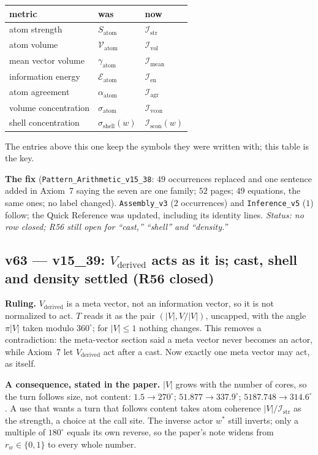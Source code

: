 \documentclass[11pt]{article}
\begin{document}
\begin{center}
\begin{tabular}{lll}
metric & was & now \\ \hline
atom strength & $S_{\text{atom}}$ & $\mathcal I_{\mathrm{str}}$ \\
atom volume & $\mathcal V_{\text{atom}}$ & $\mathcal I_{\mathrm{vol}}$ \\
mean vector volume & $\gamma_{\text{atom}}$ & $\mathcal I_{\mathrm{mean}}$ \\
information energy & $\mathcal E_{\text{atom}}$ & $\mathcal I_{\mathrm{en}}$ \\
atom agreement & $\alpha_{\text{atom}}$ & $\mathcal I_{\mathrm{agr}}$ \\
volume concentration & $\sigma_{\text{atom}}$ & $\mathcal I_{\mathrm{vcon}}$ \\
shell concentration & $\sigma_{\text{shell}}(w)$ & $\mathcal I_{\mathrm{scon}}(w)$ \\
\end{tabular}
\end{center}
The entries above this one keep the symbols they were written with; this table is the key.

\textbf{The fix} (\texttt{Pattern\_Arithmetic\_v15\_38}: $49$ occurrences replaced and one sentence added in Axiom~7 saying the seven are one family; $52$ pages; $49$ equations, the same ones; no label changed). \texttt{Assembly\_v3} ($2$ occurrences) and \texttt{Inference\_v5} ($1$) follow; the Quick Reference was updated, including its identity lines.
\emph{Status: no row closed; R56 still open for ``cast,'' ``shell'' and ``density.''}

\subsection*{v63 --- v15\_39: $V_{\text{derived}}$ acts as it is; cast, shell and density settled (R56 closed)}
\textbf{Ruling.} $V_{\text{derived}}$ is a meta vector, not an information vector, so it is not normalized to act. $T$ reads it as the pair $(\lvert V\rvert, V/\lvert V\rvert)$, uncapped, with the angle $\pi\lvert V\rvert$ taken modulo $360^\circ$; for $\lvert V\rvert\le1$ nothing changes. This removes a contradiction: the meta-vector section said a meta vector never becomes an actor, while Axiom~7 let $V_{\text{derived}}$ act after a cast. Now exactly one meta vector may act, as itself.

\textbf{A consequence, stated in the paper.} $\lvert V\rvert$ grows with the number of cores, so the turn follows size, not content: $1.5\to270^\circ$; $51.877\to337.9^\circ$; $5187.748\to314.6^\circ$. A use that wants a turn that follows content takes atom coherence $\lvert V\rvert/\mathcal I_{\mathrm{str}}$ as the strength, a choice at the call site. The inverse actor $w^{*}$ still inverts; only a multiple of $180^\circ$ equals its own reverse, so the paper's note widens from $r_w\in\{0,1\}$ to every whole number.
\end{document}

